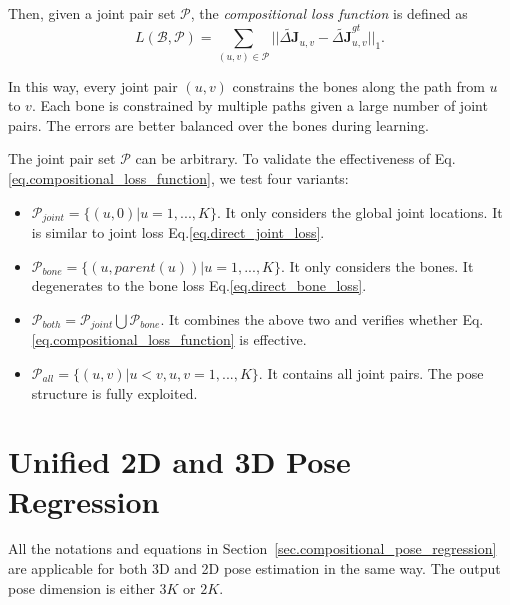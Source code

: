 \documentclass[10pt,twocolumn,letterpaper]{article}
\begin{document}
Then, given a joint pair set $\mathcal{P}$, the \emph{compositional loss function} is defined as
\begin{equation}
L(\mathcal{B},\mathcal{P}) = \sum_{(u,v)\in\mathcal{P}}||\tilde{\Delta\mathbf{J}}_{u,v} - \tilde{\Delta\mathbf{J}}_{u,v}^{gt}||_1.
\label{eq.compositional_loss_function}
\end{equation}

In this way, every joint pair $(u,v)$ constrains the bones along the path from $u$ to $v$. Each bone is constrained by multiple paths given a large number of joint pairs. The errors are better balanced over the bones during learning.

The joint pair set $\mathcal{P}$ can be arbitrary. To validate the effectiveness of Eq.\eqref{eq.compositional_loss_function}, we test four variants:

\begin{itemize}
\item $\mathcal{P}_{joint}=\{(u, 0)|u = 1,...,K\}$. It only considers the global joint locations. It is similar to joint loss Eq.\eqref{eq.direct_joint_loss}.

\item $\mathcal{P}_{bone}=\{(u,parent(u))|u = 1,...,K\}$. It only considers the bones. It degenerates to the bone loss Eq.\eqref{eq.direct_bone_loss}.

\item $\mathcal{P}_{both}=\mathcal{P}_{joint}\bigcup\mathcal{P}_{bone}$. It combines the above two and verifies whether Eq.\eqref{eq.compositional_loss_function} is effective.

\item $\mathcal{P}_{all}=\{(u,v)|u<v,u,v=1,...,K\}$. It contains all joint pairs. The pose structure is fully exploited.
\end{itemize}

\begin{comment}
\begin{figure*}[htbb]
  \centering
   \includegraphics [width=0.95\linewidth] {figure/multiple_loss.pdf}
    \caption{Multiple Loss}
    \label{fig.pipeline}
\end{figure*}
\end{comment}

\section{Unified 2D and 3D Pose Regression}
\label{sec.2d_3d_train}

All the notations and equations in Section~\ref{sec.compositional_pose_regression} are applicable for both 3D and 2D pose estimation in the same way. The output pose dimension is either $3K$ or $2K$.
\end{document}
